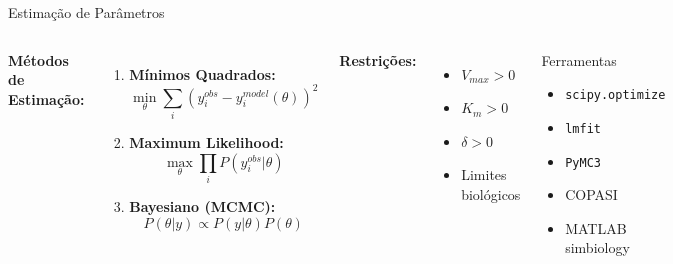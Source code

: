 \begin{frame}{Estimação de Parâmetros}
\begin{columns}
\textbf{Métodos de Estimação:}
\begin{enumerate}
    \item \textbf{Mínimos Quadrados:}
    \begin{equation*}
    \min_{\theta} \sum_i (y_i^{obs} - y_i^{model}(\theta))^2
    \end{equation*}

    \item \textbf{Maximum Likelihood:}
    \begin{equation*}
    \max_{\theta} \prod_i P(y_i^{obs}|\theta)
    \end{equation*}

    \item \textbf{Bayesiano (MCMC):}
    \begin{equation*}
    P(\theta|y) \propto P(y|\theta)P(\theta)
    \end{equation*}
\end{enumerate}

\textbf{Restrições:}
\begin{itemize}
    \item $V_{max} > 0$
    \item $K_m > 0$
    \item $\delta > 0$
    \item Limites biológicos
\end{itemize}

\vspace{0.3cm}

\begin{exampleblock}{Ferramentas}
\begin{itemize}
    \item \texttt{scipy.optimize}
    \item \texttt{lmfit}
    \item \texttt{PyMC3}
    \item COPASI
    \item MATLAB simbiology
\end{itemize}
\end{exampleblock}
\end{columns}

\vspace{0.3cm}

\end{frame}

